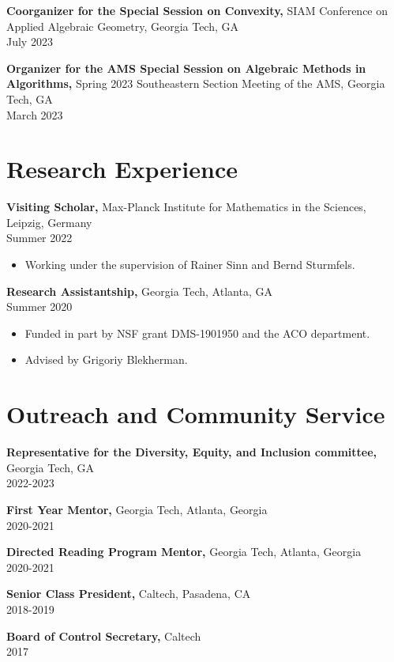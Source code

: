 \documentclass[margin]{res}
\begin{document}
\begin{resume}
{\bf Coorganizer for the Special Session on Convexity,} SIAM Conference on Applied Algebraic Geometry, Georgia Tech, GA    \\       July 2023

{\bf Organizer for the AMS Special Session on Algebraic Methods in Algorithms,} Spring 2023 Southeastern Section Meeting of the AMS, Georgia Tech, GA    \\       March 2023

\section{Research Experience}
{\bf Visiting Scholar,} Max-Planck Institute for Mathematics in the Sciences, Leipzig, Germany \\ Summer 2022
\begin{itemize} \itemsep -2pt %
\item Working under the supervision of Rainer Sinn and Bernd Sturmfels.
\end{itemize}
{\bf Research Assistantship,} Georgia Tech, Atlanta, GA \\ Summer 2020
\begin{itemize} \itemsep -2pt %
\item Funded in part by NSF grant DMS-1901950 and the ACO department.
\item Advised by Grigoriy Blekherman.
\end{itemize}

\section{Outreach and Community Service} 
       {\bf Representative for the Diversity, Equity, and Inclusion committee,} Georgia Tech, GA    \\         2022-2023

       {\bf First Year Mentor,} Georgia Tech, Atlanta, Georgia     \\         2020-2021 

       {\bf Directed Reading Program Mentor,} Georgia Tech, Atlanta, Georgia     \\         2020-2021 

       {\bf Senior Class President,} Caltech, Pasadena, CA    \\         2018-2019 

		{\bf Board of Control Secretary,} Caltech \\   2017


\end{resume}
\end{document}
